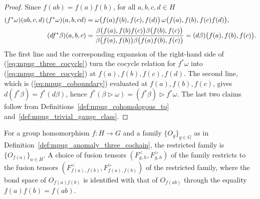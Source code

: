 \begin{proof}\leanok
    Since $f(ab)=f(a)f(b)$, for all $a,b,c,d\in H$
    \begin{align}
        (f^*\omega)(ab,c,d)\,(f^*\omega)(a,b,cd)
         & =\omega\bigl(f(a)f(b),f(c),f(d)\bigr)\,
        \omega\bigl(f(a),f(b),f(c)f(d)\bigr),
        \notag                                                              \\
        (d f^*\beta)(a,b,c)
         & =\frac{\beta\bigl(f(a),f(b)f(c)\bigr)\beta\bigl(f(b),f(c)\bigr)}
        {\beta\bigl(f(a),f(b)\bigr)\beta\bigl(f(a)f(b),f(c)\bigr)}
        =(d\beta)\bigl(f(a),f(b),f(c)\bigr).
        \notag
    \end{align}
    The first line and the corresponding expansion of the right-hand side
    of (\ref{eq:mpug_three_cocycle}) turn the cocycle relation for $f^*\omega$
    into (\ref{eq:mpug_three_cocycle}) at $f(a),f(b),f(c),f(d)$. The second
    line, which is (\ref{eq:mpug_coboundary}) evaluated at $f(a),f(b),f(c)$,
    gives $d(f^*\beta)=f^*(d\beta)$, hence
    $f^*(\beta\mathbin{\triangleright}\omega)
        =(f^*\beta)\mathbin{\triangleright}f^*\omega$. The last two claims
    follow from Definitions~\ref{def:mpug_cohomologous_to}
    and~\ref{def:mpug_trivial_gauge_class}.
\end{proof}

\begin{definition}
    \label{def:mpug_family_restriction}
    \leanok
    For a group homomorphism $f\colon H\to G$ and a family
    $\{O_g\}_{g\in G}$ as in Definition~\ref{def:mpug_anomaly_three_cochain},
    the restricted family is $\{O_{f(a)}\}_{a\in H}$. A choice of fusion
    tensors $(F^<_{g,h},F^>_{g,h})$ of the family restricts to the fusion
    tensors $(F^<_{f(a),f(b)},F^>_{f(a),f(b)})$ of the restricted family,
    where the bond space of $O_{f(a)f(b)}$ is identified with that of
    $O_{f(ab)}$ through the equality $f(a)f(b)=f(ab)$.
\end{definition}

